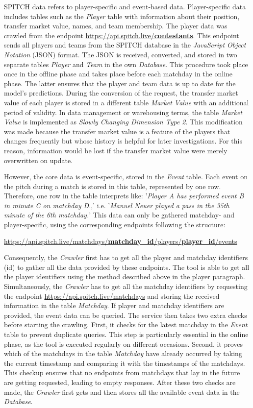 SPITCH data refers to player-specific and event-based data. Player-specific data includes tables such as the \emph{Player} table with information about their position, transfer market value, names, and team membership. The player data was crawled from the endpoint \underline{https://api.spitch.live/\textbf{contestants}}. This endpoint sends all players and teams from the SPITCH database in the \emph{JavaScript Object Notation} (JSON) format. The JSON is received, converted, and stored in two separate tables \emph{Player} and \emph{Team} in the own \emph{Database}. This procedure took place once in the offline phase and takes place before each matchday in the online phase. The latter ensures that the player and team data is up to date for the model's predictions. During the conversion of the request, the transfer market value of each player is stored in a different table \emph{Market Value} with an additional period of validity. In data management or warehousing terms, the table \emph{Market Value} is implemented as \emph{Slowly Changing Dimension Type 2}. This modification was made because the transfer market value is a feature of the players that changes frequently but whose history is helpful for later investigations. For this reason, information would be lost if the transfer market value were merely overwritten on update. 

However, the core data is event-specific, stored in the \emph{Event} table. Each event on the pitch during a match is stored in this table, represented by one row. Therefore, one row in the table interprets like: '\emph{Player A has performed event B in minute C on matchday D.},' i.e. '\emph{Manuel Neuer played a pass in the 35th minute of the 6th matchday.}' This data can only be gathered matchday- and player-specific, using the corresponding endpoints following the structure:\\
\centerline{\underline{https://api.spitch.live/matchdays/\textbf{matchday\_id}/players/\textbf{player\_id}/events}}

Consequently, the \emph{Crawler} first has to get all the player and matchday identifiers (id) to gather all the data provided by these endpoints. The tool is able to get all the player identifiers using the method described above in the player paragraph. Simultaneously, the \emph{Crawler} has to get all the matchday identifiers by requesting the endpoint \underline{https://api.spitch.live/matchdays} and storing the received information in the table \emph{Matchday}. If player and matchday identifiers are provided, the event data can be queried. The service then takes two extra checks before starting the crawling. First, it checks for the latest matchday in the \emph{Event} table to prevent duplicate queries. This step is particularly essential in the online phase, as the tool is executed regularly on different occasions. Second, it proves which of the matchdays in the table \emph{Matchday} have already occurred by taking the current timestamp and comparing it with the timestamps of the matchdays. This checkup ensures that no endpoints from matchdays that lay in the future are getting requested, leading to empty responses. After these two checks are made, the \emph{Crawler} first gets and then stores all the available event data in the \emph{Database}.

